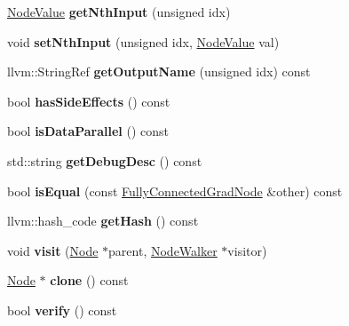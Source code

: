 \begin{DoxyCompactItemize}
\item 
\mbox{\label{classglow_1_1_fully_connected_grad_node_acb09555407bfeced78d0367a3655d6b7}} 
\hyperlink{structglow_1_1_node_value}{Node\+Value} {\bfseries get\+Nth\+Input} (unsigned idx)
\item 
\mbox{\label{classglow_1_1_fully_connected_grad_node_a0d42b0af397172c28dda560f4c3eb67c}} 
void {\bfseries set\+Nth\+Input} (unsigned idx, \hyperlink{structglow_1_1_node_value}{Node\+Value} val)
\item 
\mbox{\label{classglow_1_1_fully_connected_grad_node_a01aaff263a848e9441cefa4f9a9f20f3}} 
llvm\+::\+String\+Ref {\bfseries get\+Output\+Name} (unsigned idx) const
\item 
\mbox{\label{classglow_1_1_fully_connected_grad_node_abbd87832969e09305db24618a81a5ba6}} 
bool {\bfseries has\+Side\+Effects} () const
\item 
\mbox{\label{classglow_1_1_fully_connected_grad_node_ac7f1a0dc601661b21e2dc501f58f268d}} 
bool {\bfseries is\+Data\+Parallel} () const
\item 
\mbox{\label{classglow_1_1_fully_connected_grad_node_a1a96238c53f209c91ee64e19cb004ab2}} 
std\+::string {\bfseries get\+Debug\+Desc} () const
\item 
\mbox{\label{classglow_1_1_fully_connected_grad_node_abcaf7b5943fb49d4ec8572724629dae3}} 
bool {\bfseries is\+Equal} (const \hyperlink{classglow_1_1_fully_connected_grad_node}{Fully\+Connected\+Grad\+Node} \&other) const
\item 
\mbox{\label{classglow_1_1_fully_connected_grad_node_a95fb8916f9718d263cd39af1bae948c1}} 
llvm\+::hash\+\_\+code {\bfseries get\+Hash} () const
\item 
\mbox{\label{classglow_1_1_fully_connected_grad_node_af3a6532daf397c62c6cc7cf9fd6f86ee}} 
void {\bfseries visit} (\hyperlink{classglow_1_1_node}{Node} $\ast$parent, \hyperlink{classglow_1_1_node_walker}{Node\+Walker} $\ast$visitor)
\item 
\mbox{\label{classglow_1_1_fully_connected_grad_node_a41fcc288604a330e3dbdbe10db89d6a7}} 
\hyperlink{classglow_1_1_node}{Node} $\ast$ {\bfseries clone} () const
\item 
\mbox{\label{classglow_1_1_fully_connected_grad_node_abb8493e820a8e1a51360fcb9a80d954a}} 
bool {\bfseries verify} () const
\end{DoxyCompactItemize}
